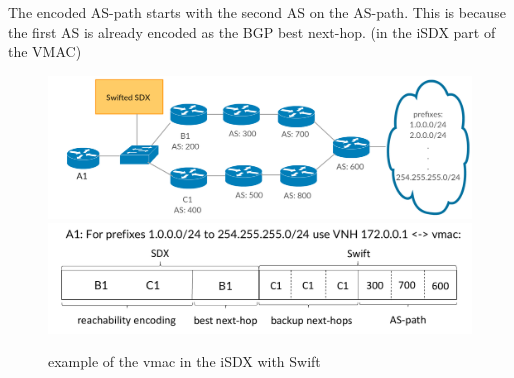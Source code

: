 The encoded AS-path starts with the second AS on the AS-path. This is because the first AS is already encoded as the BGP best next-hop. (in the iSDX part of the VMAC)

\begin{figure}[h]
\center
\includegraphics[scale = 0.24]{Figures/design_vmac_topology.pdf}
\includegraphics[scale = 0.35]{Figures/design_vmac_cropped.pdf}
\caption{example of the vmac in the iSDX with Swift}
\end{figure}

\newpage
